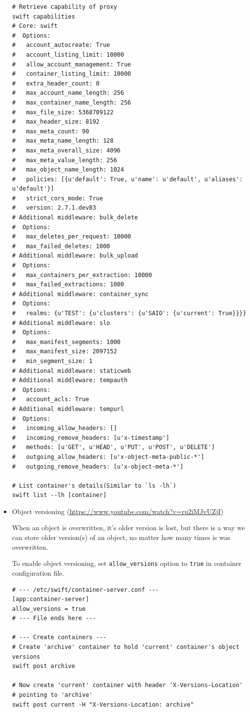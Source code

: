 \documentclass{article}
\begin{document}
\begin{itemize}
\begin{verbatim}
# Retrieve capability of proxy
swift capabilities
# Core: swift
#  Options:
#   account_autocreate: True
#   account_listing_limit: 10000
#   allow_account_management: True
#   container_listing_limit: 10000
#   extra_header_count: 0
#   max_account_name_length: 256
#   max_container_name_length: 256
#   max_file_size: 5368709122
#   max_header_size: 8192
#   max_meta_count: 90
#   max_meta_name_length: 128
#   max_meta_overall_size: 4096
#   max_meta_value_length: 256
#   max_object_name_length: 1024
#   policies: [{u'default': True, u'name': u'default', u'aliases': u'default'}]
#   strict_cors_mode: True
#   version: 2.7.1.dev83
# Additional middleware: bulk_delete
#  Options:
#   max_deletes_per_request: 10000
#   max_failed_deletes: 1000
# Additional middleware: bulk_upload
#  Options:
#   max_containers_per_extraction: 10000
#   max_failed_extractions: 1000
# Additional middleware: container_sync
#  Options:
#   realms: {u'TEST': {u'clusters': {u'SAIO': {u'current': True}}}}
# Additional middleware: slo
#  Options:
#   max_manifest_segments: 1000
#   max_manifest_size: 2097152
#   min_segment_size: 1
# Additional middleware: staticweb
# Additional middleware: tempauth
#  Options:
#   account_acls: True
# Additional middleware: tempurl
#  Options:
#   incoming_allow_headers: []
#   incoming_remove_headers: [u'x-timestamp']
#   methods: [u'GET', u'HEAD', u'PUT', u'POST', u'DELETE']
#   outgoing_allow_headers: [u'x-object-meta-public-*']
#   outgoing_remove_headers: [u'x-object-meta-*']

# List container's details(Similar to `ls -lh`)
swift list --lh [container]
\end{verbatim}

\item Object versioning (\url{https://www.youtube.com/watch?v=ru2iMJvUZjI})

When an object is overwritten, it's older version is lost, but
there is a way we can store older version(s) of an object, no
matter how many times is was overwritten.

To enable object versioning, set \texttt{allow\_versions} option to
\texttt{true} in container configuration file.
\begin{verbatim}
# --- /etc/swift/container-server.conf ---
[app:container-server]
allow_versions = true
# --- File ends here ---

# --- Create containers ---
# Create 'archive' container to hold 'current' container's object versions
swift post archive

# Now create 'current' container with header 'X-Versions-Location'
# pointing to 'archive'
swift post current -H "X-Versions-Location: archive"


\end{verbatim}
\end{itemize}
\end{document}
